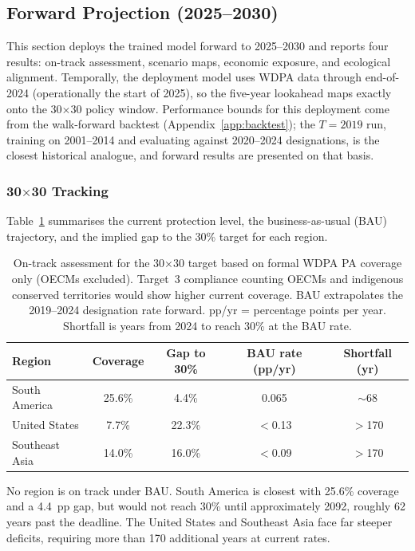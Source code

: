 \documentclass[12pt]{article}
\theoremstyle{break}
\begin{document}
\subsection{Forward Projection (2025--2030)}
\label{sec:results_forward}

This section deploys the trained model forward to 2025--2030 and reports four 
results: on-track assessment, scenario maps, economic exposure, and ecological 
alignment. Temporally, the deployment model uses WDPA data through end-of-2024 
(operationally the start of 2025), so the five-year lookahead maps exactly onto 
the 30$\times$30 policy window. Performance bounds for this deployment come from 
the walk-forward backtest (Appendix~\ref{app:backtest}); the $T=2019$ run, training 
on 2001--2014 and evaluating against 2020--2024 designations, is the closest 
historical analogue, and forward results are presented on that basis.

\subsubsection{30$\times$30 Tracking}
\label{sec:results_ontrack}

Table~\ref{tab:ontrack} summarises the current protection level, the business-as-usual
(BAU) trajectory, and the implied gap to the 30\% target for each region.

\begin{table}[H]
\centering
\caption{On-track assessment for the 30$\times$30 target based on formal WDPA PA
coverage only (OECMs excluded). Target~3 compliance counting OECMs and indigenous
conserved territories would show higher current coverage. BAU extrapolates the
2019--2024 designation rate forward. pp/yr = percentage points per year.
Shortfall is years from 2024 to reach 30\% at the BAU rate.}
\label{tab:ontrack}
\small
\begin{tabular}{lcccc}
\toprule
\textbf{Region} & \textbf{Coverage} & \textbf{Gap to 30\%}
  & \textbf{BAU rate (pp/yr)} & \textbf{Shortfall (yr)} \\
\midrule
South America  & 25.6\% & 4.4\%  & 0.065    & $\sim$68 \\
United States  & 7.7\%  & 22.3\% & $<$0.13  & $>$170   \\
Southeast Asia & 14.0\% & 16.0\% & $<$0.09  & $>$170   \\
\bottomrule
\end{tabular}
\end{table}
No region is on track under BAU. South America is closest with 25.6\% coverage 
and a 4.4~pp gap, but would not reach 30\% until approximately 2092, roughly
62 years past the deadline. The United States and Southeast Asia face far 
steeper deficits, requiring more than 170 additional years at current rates.
\end{document}
